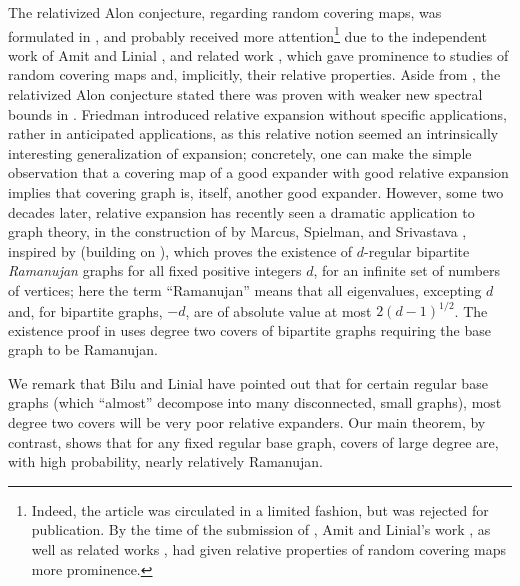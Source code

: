 \documentclass{memo-l}
\theoremstyle{plain}
\theoremstyle{definition}
\numberwithin{section}{chapter}
\numberwithin{equation}{chapter}
\theoremstyle{plain}
\theoremstyle{definition}
\begin{document}

The relativized Alon conjecture, regarding random covering maps,
was formulated in \cite{friedman_relative}, and probably received more
attention\footnote{Indeed, the article \cite{friedman_relative_boolean} 
was circulated in a limited fashion, but was rejected for
publication.
By the time of the submission of \cite{friedman_relative}, 
Amit and Linial's 
work \cite{amit1}, as well as related works \cite{amit2,amit3,amit0},
had given relative properties of random covering maps more prominence.}
due to the independent work of Amit and Linial \cite{amit1},
and related work \cite{amit2,amit3,amit0}, which gave prominence to
studies of random covering maps and, implicitly, their relative properties.
Aside from \cite{friedman_relative}, the relativized Alon conjecture
stated there was proven
with weaker new spectral bounds in 
\cite{linial_puder,lubetzky,a-b,puder}.
Friedman introduced relative expansion \cite{friedman_relative_boolean}
without specific applications, rather in anticipated applications, as this
relative notion seemed an intrinsically interesting generalization of
expansion; concretely, one can make the simple observation 
that a covering map of a good expander
with good relative expansion implies that
covering graph is, itself, another good expander.  
However,
some two decades later,
relative expansion
has recently seen a dramatic application to graph theory, 
in the construction of
by Marcus, Spielman, and Srivastava
\cite{mss}, inspired by \cite{bilu} (building on \cite{frieze_malloy}), 
which proves the existence
of $d$-regular bipartite {\em Ramanujan} graphs for all fixed positive
integers $d$, for an infinite set of 
numbers of vertices; here the term ``Ramanujan'' means that all
eigenvalues, excepting $d$ and, for bipartite graphs, $-d$, 
are of absolute value at most
$2(d-1)^{1/2}$.
The existence proof in \cite{mss} uses degree two covers of bipartite
graphs requiring the base graph to be Ramanujan. 

We remark that 
Bilu and Linial \cite{bilu} have pointed out that for certain
regular base graphs
(which ``almost'' decompose into many
disconnected, small graphs), most degree two covers will be very poor
relative expanders.  Our main theorem, by contrast, shows that for any
fixed regular base graph, covers of large degree are, with high probability,
nearly relatively Ramanujan.
\end{document}

